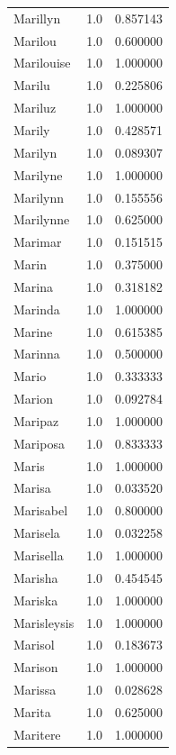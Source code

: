 \documentclass[
  letterpaper,
  DIV=11,
  numbers=noendperiod]{scrreprt}
\begin{document}
\begin{tabular}{lrr}
Marillyn        &   1.0 &   0.857143 \\
Marilou         &   1.0 &   0.600000 \\
Marilouise      &   1.0 &   1.000000 \\
Marilu          &   1.0 &   0.225806 \\
Mariluz         &   1.0 &   1.000000 \\
Marily          &   1.0 &   0.428571 \\
Marilyn         &   1.0 &   0.089307 \\
Marilyne        &   1.0 &   1.000000 \\
Marilynn        &   1.0 &   0.155556 \\
Marilynne       &   1.0 &   0.625000 \\
Marimar         &   1.0 &   0.151515 \\
Marin           &   1.0 &   0.375000 \\
Marina          &   1.0 &   0.318182 \\
Marinda         &   1.0 &   1.000000 \\
Marine          &   1.0 &   0.615385 \\
Marinna         &   1.0 &   0.500000 \\
Mario           &   1.0 &   0.333333 \\
Marion          &   1.0 &   0.092784 \\
Maripaz         &   1.0 &   1.000000 \\
Mariposa        &   1.0 &   0.833333 \\
Maris           &   1.0 &   1.000000 \\
Marisa          &   1.0 &   0.033520 \\
Marisabel       &   1.0 &   0.800000 \\
Marisela        &   1.0 &   0.032258 \\
Marisella       &   1.0 &   1.000000 \\
Marisha         &   1.0 &   0.454545 \\
Mariska         &   1.0 &   1.000000 \\
Marisleysis     &   1.0 &   1.000000 \\
Marisol         &   1.0 &   0.183673 \\
Marison         &   1.0 &   1.000000 \\
Marissa         &   1.0 &   0.028628 \\
Marita          &   1.0 &   0.625000 \\
Maritere        &   1.0 &   1.000000 \\

\end{tabular}
\end{document}
